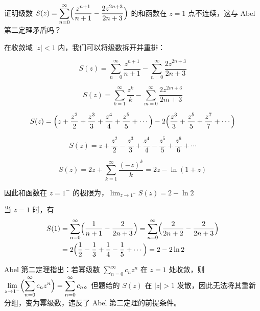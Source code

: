 \begin{question}
证明级数 \(\displaystyle S(z) = \sum_{n=0}^{\infty} \Bigl(\frac{z^{n+1}}{n+1} - \frac{2z^{2n+3}}{2n+3}\Bigr)\) 的和函数在 \(z=1\) 点不连续，这与 Abel 第二定理矛盾吗？

\begin{solution}
在收敛域 \(|z|<1\) 内，我们可以将级数拆开并重排：

\[
S(z) = \sum_{n=0}^{\infty} \frac{z^{n+1}}{n+1} - \sum_{n=0}^{\infty} \frac{2z^{2n+3}}{2n+3}
\]

\[
S(z) = \sum_{k=1}^{\infty} \frac{z^{k}}{k} - \sum_{m=0}^{\infty} \frac{2z^{2m+3}}{2m+3}
\]

\[
S(z) = \Bigl(z + \frac{z^2}{2} + \frac{z^3}{3} + \frac{z^4}{4} + \frac{z^5}{5} + \cdots\Bigr) - 2\Bigl(\frac{z^3}{3} + \frac{z^5}{5} + \frac{z^7}{7} + \cdots\Bigr)
\]

\[
S(z) = z + \frac{z^2}{2} - \frac{z^3}{3} + \frac{z^4}{4} - \frac{z^5}{5} + \frac{z^6}{6} + \cdots
\]

\[
S(z) = 2z + \sum_{k=1}^{\infty} \frac{(-z)^k}{k} = 2z - \ln(1+z)
\]

因此和函数在 \(z=1^-\) 的极限为，\(\displaystyle\lim_{z\to 1^{-}} S(z) = 2 - \ln 2\)

当 \(z=1\) 时，有
\[
\begin{aligned}
S(1) &= \sum_{n=0}^{\infty} \Bigl(\frac1{n+1} - \frac{2}{2n+3}\Bigr) = \sum_{n=0}^{\infty} \Bigl(\frac{2}{2n+2} - \frac{2}{2n+3}\Bigr) \\
&= 2\Bigl(\frac12 - \frac13 + \frac14 - \frac15 + \cdots\Bigr) = 2 - 2\ln 2
\end{aligned}
\]

Abel 第二定理指出：若幂级数 \(\displaystyle\sum_{n=0}^{\infty} c_n z^n\) 在 \(z=1\) 处收敛，则 \(\displaystyle\lim_{z\to 1^{-}} \Bigl(\sum_{n=0}^{\infty} c_n z^n\Bigr) = \sum_{n=0}^{\infty} c_n\)。但题给的 \(S(z)\) 在 \(|z|>1\) 发散，因此无法将其重新分组，变为幂级数，违反了 Abel 第二定理的前提条件。
\end{solution}
\end{question}

